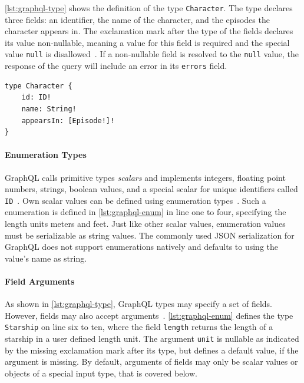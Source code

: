 \autoref{lst:graphql-type} shows the definition of the type \texttt{Character}.
The type declares three fields: an identifier, the name of the character, and the episodes the character appears in.
The exclamation mark after the type of the fields declares its value non-nullable, meaning a value for this field is required and the special value \texttt{null} is disallowed~\cite{Facebook2018}.
If a non-nullable field is resolved to the \texttt{null} value, the response of the query will include an error in its \texttt{errors} field.

\begin{lstlisting}[caption={GraphQL Type Definition}, language=graphqls, label={lst:graphql-type}]
type Character {
    id: ID!
    name: String!
    appearsIn: [Episode!]!
}
\end{lstlisting}


\paragraph{Enumeration Types}

GraphQL calls primitive types \textit{scalars} and implements integers, floating point numbers, strings, boolean values, and a special scalar for unique identifiers called \texttt{ID}~\cite{Facebook2018}.
Own scalar values can be defined using enumeration types~\cite{Diaz2020}.
Such a enumeration is defined in \autoref{lst:graphql-enum} in line one to four, specifying the length units meters and feet.
Just like other scalar values, enumeration values must be serializable as string values.
The commonly used \ac{JSON} serialization for GraphQL does not support enumerations natively and defaults to using the value's name as string.

\paragraph{Field Arguments}

As shown in \autoref{lst:graphql-type}, GraphQL types may specify a set of fields.
However, fields may also accept arguments~\cite{Diaz2020}.
\autoref{lst:graphql-enum} defines the type \texttt{Starship} on line six to ten, where the field \texttt{length} returns the length of a starship in a user defined length unit.
The argument \texttt{unit} is nullable as indicated by the missing exclamation mark after its type, but defines a default value, if the argument is missing.
By default, arguments of fields may only be scalar values or objects of a special input type, that is covered below. 


